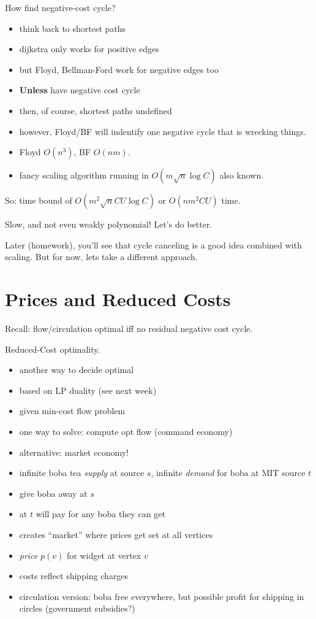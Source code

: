 \documentclass{article}
\begin{document}
How find negative-cost cycle?
\begin{itemize}
\item think back to shortest paths
\item dijkstra only works for positive edges
\item but Floyd, Bellman-Ford work for negative edges too
\item {\bf Unless} have negative cost cycle
\item then, of course, shortest paths undefined
\item however, Floyd/BF will indentify one negative cycle that is
  wrecking things.
\item Floyd $O(n^3)$, BF $O(nm)$.
\item fancy scaling algorithm running in $O(m\sqrt{n}\log C)$ also
  known.
\end{itemize}

So: time bound of $O(m^2\sqrt{n}CU\log C)$ or $O(nm^2CU)$ time.

Slow, and not even weakly polynomial!  Let's do better.

Later (homework), you'll see that cycle canceling is a good idea
combined with scaling.  But for now,
lets take a different approach.


\section*{Prices and Reduced Costs}


Recall: flow/circulation optimal iff no residual negative cost cycle.

Reduced-Cost optimality.
\begin{itemize}
\item another way to decide optimal
\item based on LP duality (see next week)
\item given min-cost flow problem
\item one way to solve: compute opt flow (command economy)
\item alternative: market economy!
\item infinite boba tea {\em supply} at source $s$, infinite {\em
    demand} for boba at MIT source $t$
\item give boba away at $s$
\item at $t$  will pay for any boba they can get
\item creates ``market'' where prices get set at all vertices
\item {\em price} $p(v)$ for widget at vertex $v$
\item costs reflect shipping charges
\item circulation version: boba free everywhere, but possible profit
  for shipping in circles (government subsidies?)
\end{itemize}
\end{document}
